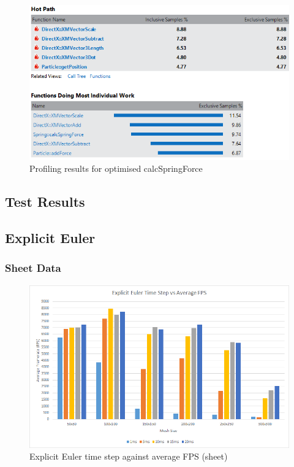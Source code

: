\begin{landscape}
    \begin{figure}[!htb]
    \begin{center}
      \includegraphics[scale=1.0]{Figures/calcspringforce_profiling_after}
    \end{center}
    \caption{Profiling results for optimised calcSpringForce}
    \label{fig:profiling4}
  \end{figure}
\end{landscape}

\begin{landscape}
\chapter{Test Results}

\section{Explicit Euler}

\subsection{Sheet Data}

  \begin{figure}[!htb]
    \begin{center}
      \includegraphics{Figures/sheet_ee_fps}
    \end{center}
    \caption{Explicit Euler time step against average FPS (sheet)}
    \label{fig:ee fps sheet}
  \end{figure}
\end{landscape}
  
